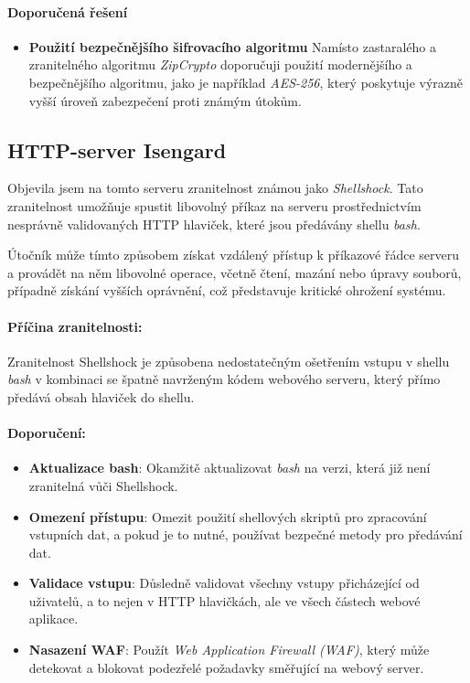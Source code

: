 \documentclass{article}
\begin{document}
\paragraph{Doporučená řešení}
\begin{itemize}[leftmargin=2em]
    \item \textbf{Použití bezpečnějšího šifrovacího algoritmu}  
    Namísto zastaralého a zranitelného algoritmu \textit{ZipCrypto} doporučuji použití modernějšího a bezpečnějšího algoritmu, jako je například \textit{AES-256}, který poskytuje výrazně vyšší úroveň zabezpečení proti známým útokům.
\end{itemize}
\subsection{HTTP-server Isengard}
Objevila jsem na tomto serveru zranitelnost známou jako \textit{Shellshock}. Tato zranitelnost umožňuje spustit libovolný příkaz na serveru prostřednictvím nesprávně validovaných HTTP hlaviček, které jsou předávány shellu \textit{bash}. 

Útočník může tímto způsobem získat vzdálený přístup k příkazové řádce serveru a provádět na něm libovolné operace, včetně čtení, mazání nebo úpravy souborů, případně získání vyšších oprávnění, což představuje kritické ohrožení systému.

\paragraph{Příčina zranitelnosti:}
Zranitelnost Shellshock je způsobena nedostatečným ošetřením vstupu v shellu \textit{bash} v kombinaci se špatně navrženým kódem webového serveru, který přímo předává obsah hlaviček do shellu.

\paragraph{Doporučení:}
\begin{itemize}
    \item \textbf{Aktualizace bash}: Okamžitě aktualizovat \textit{bash} na verzi, která již není zranitelná vůči Shellshock.
    \item \textbf{Omezení přístupu}: Omezit použití shellových skriptů pro zpracování vstupních dat, a pokud je to nutné, používat bezpečné metody pro předávání dat.
    \item \textbf{Validace vstupu}: Důsledně validovat všechny vstupy přicházející od uživatelů, a to nejen v HTTP hlavičkách, ale ve všech částech webové aplikace.
    \item \textbf{Nasazení WAF}: Použít \textit{Web Application Firewall (WAF)}, který může detekovat a blokovat podezřelé požadavky směřující na webový server.
\end{itemize}
\end{document}
